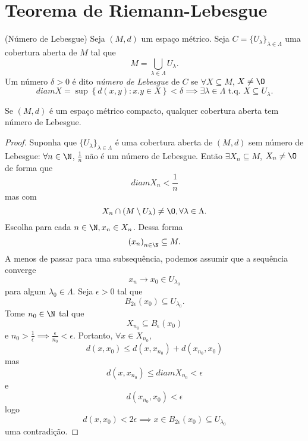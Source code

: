 
\section*{Teorema de Riemann-Lebesgue}

\begin{definition}
    (Número de Lebesgue) Seja $\left( M,d \right) $ um espaço métrico. Seja $C=\{U_\lambda\} _{\lambda \in \Lambda}$ uma cobertura aberta de $M$ tal que \[
    M = \bigcup_{\lambda \in  \Lambda} U_\lambda
    .\] Um número $\delta >0$ é dito \emph{número de Lebesgue} de $C$ se $\forall X\subseteq M$, $X\neq \O$ \[
    diam X = \sup \left\{ d\left( x,y \right) : x.y\in X \right\} < \delta \implies \exists \lambda \in \Lambda \text{ t.q. } X\subseteq U_\lambda
    .\] 
\end{definition}
\begin{lemma}\label{lemma:lebesgue-1}
    Se $\left( M,d \right) $ é um espaço métrico compacto, qualquer cobertura aberta tem número de Lebesgue.
\end{lemma}
\begin{proof}
    Suponha que $\{U_\lambda\} _{\lambda\in \Lambda}$ é uma cobertura aberta de $\left( M,d \right) $ sem número de Lebesgue: $\forall n\in \N$, $\frac{1}{n}$ não é um número de Lebesgue. Então $\exists X_n\subseteq M$, $X_n \neq \O$ de forma que \[
    diam X_n < \frac{1}{n}
    \] mas com \[
    X_n \cap \left( M\setminus U_\lambda \right) \neq \O, \forall \lambda \in \Lambda
    .\] Escolha para cada $n\in \N, x_{n}\in X_n$. Dessa forma \[
    \left( x_n \right) _{n\in \N}\subseteq M
    .\] A menos de passar para uma subsequência, podemos assumir que a sequência converge \[
    x_n \to x_0 \in  U_{\lambda_0}
    \] para algum $\lambda_0 \in \Lambda$.
    Seja $\epsilon>0$ tal que \[
    B_{2\epsilon}\left( x_0 \right) \subseteq U_{\lambda_0}
    .\] Tome $n_0\in \N$ tal que \[
    X_{n_0}\subseteq B_{\epsilon}\left( x_0 \right) 
    \] e $ n_0 > \frac{1}{\epsilon} \implies \frac{\epsilon}{n_0} < \epsilon$. Portanto, $\forall x\in X_{n_0}$, \[
    d\left( x,x_0 \right) \le d\left( x, x_{n_0} \right) + d\left( x_{n_0}, x_0 \right) 
    \] mas \[
    d\left( x, x_{n_0} \right) \le diam X_{n_0} < \epsilon
    \] e \[
    d\left( x_{n_0}, x_0 \right) < \epsilon
    \] logo \[
    d\left( x,x_0 \right) < 2\epsilon \implies x\in B_{2\epsilon}\left( x_0 \right) \subseteq U_{\lambda_0}
    \] uma contradição.
\end{proof}

